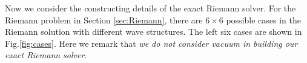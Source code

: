 \documentclass[review]{elsarticle}
\numberwithin{equation}{section}
\numberwithin{table}{section}
\begin{document}

Now we consider the constructing details of the exact  Riemann  solver. For  the Riemann problem in Section \ref{sec:Riemann}, there are  $6\times 6$ possible  cases in the Riemann solution with different wave structures.  The left six cases are  shown in Fig.\ref{fig:cases}. Here we remark that \emph{we do not consider vacuum in building our exact Riemann solver}.
\end{document}

